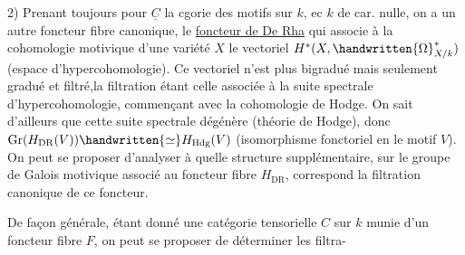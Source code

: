 2) Prenant toujours pour $\underline{C}$ la cgorie des motifs sur $k$, ec $k$ de car. nulle, on a un autre foncteur fibre canonique, le \uline{foncteur de De Rha} qui associe à la cohomologie motivique d'une variété $X$ le vectoriel $H^*(X,\handwritten{\Omega}^*_{X/k})$ (espace d'hypercohomologie). Ce vectoriel n'est plus bigradué mais seulement gradué et filtré,la filtration étant celle associée à la suite spectrale d'hypercohomologie, commençant avec la cohomologie de Hodge. On sait d'ailleurs que cette suite spectrale dégénère (théorie de Hodge), donc $\operatorname{Gr}(H_{\mathrm{DR}}(V))\handwritten{\simeq}H_{\mathrm{Hdg}}(V)$ (isomorphisme fonctoriel en le motif $V$). On peut se proposer d'analyser à quelle structure supplémentaire, sur le groupe de Galois motivique associé au foncteur fibre $H_{\mathrm{DR}}$, correspond la filtration canonique de ce foncteur.


De façon générale, étant donné une catégorie tensorielle $C$ sur $k$ munie d'un foncteur fibre $F$, on peut se proposer de déterminer les filtra-

